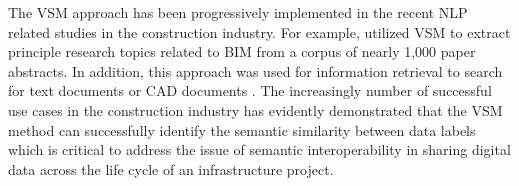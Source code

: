\documentclass[Journal,InsideFigs, DoubleSpace]{ascelike} %
\begin{document}
\par
The VSM approach has been progressively implemented in the recent NLP related studies in the construction industry. For example,  utilized VSM to extract principle research topics related to BIM from a corpus of nearly 1,000 paper abstracts. In addition, this approach was used for information retrieval to search for text documents \cite{lv15} or CAD documents \cite{hsu13}. The increasingly number of successful use cases in the construction industry has evidently demonstrated that the VSM method can successfully identify the semantic similarity between data labels which is critical to address the issue of semantic interoperability in sharing digital data across the life cycle of an infrastructure project.
%
\end{document}
